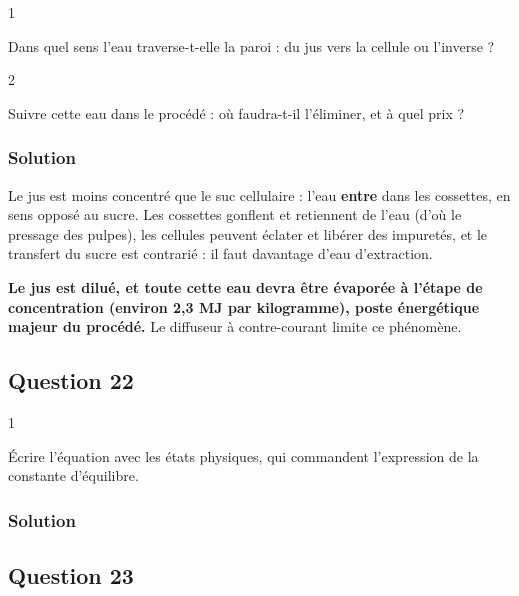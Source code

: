 \documentclass[11pt,a4paper]{article}
\newcommand{\equationajustee}[1]{%
  \sbox{\boiteequation}{$\displaystyle #1$}%
  \ifdim\wd\boiteequation>\linewidth
    \[\resizebox{\linewidth}{!}{\usebox{\boiteequation}}\]%
  \else
    \[#1\]%
  \fi}
\begin{document}
\begin{indication}{1}

Dans quel sens l'eau traverse-t-elle la paroi : du jus vers la cellule ou l'inverse ?

\end{indication}

\begin{indication}{2}

Suivre cette eau dans le procédé : où faudra-t-il l'éliminer, et à quel prix ?

\end{indication}

\hypertarget{solution-20}{%
\subsubsection{Solution}\label{solution-20}}

Le jus est moins concentré que le suc cellulaire : l'eau \textbf{entre} dans les cossettes, en sens opposé au sucre. Les cossettes gonflent et retiennent de l'eau (d'où le pressage des pulpes), les cellules peuvent éclater et libérer des impuretés, et le transfert du sucre est contrarié : il faut davantage d'eau d'extraction.

\textbf{Le jus est dilué, et toute cette eau devra être évaporée à l'étape de concentration (environ 2,3 MJ par kilogramme), poste énergétique majeur du procédé.} Le diffuseur à contre-courant limite ce phénomène.

\hypertarget{question-22}{%
\subsection{Question 22}\label{question-22}}

\begin{indication}{1}

Écrire l'équation avec les états physiques, qui commandent l'expression de la constante d'équilibre.

\end{indication}

\hypertarget{solution-21}{%
\subsubsection{Solution}\label{solution-21}}

\equationajustee{\boxed{\mathrm{CaCO_3(s)}=\mathrm{CaO(s)}+\mathrm{CO_2(g)}}}

\hypertarget{question-23}{%
\subsection{Question 23}\label{question-23}}
\end{document}
